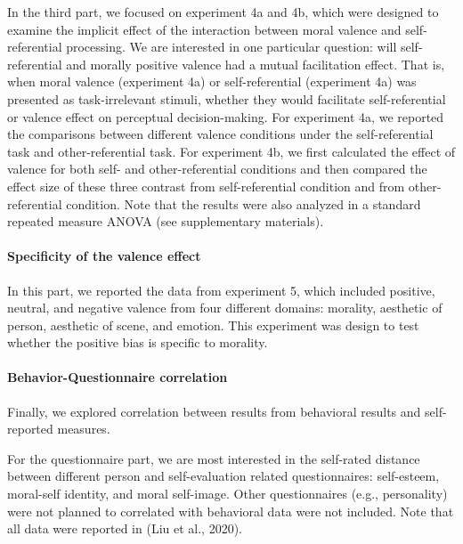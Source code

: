\documentclass[
  english,
  man]{apa6}
\let\oldparagraph\paragraph
\renewcommand{\paragraph}[1]{\oldparagraph{#1}\mbox{}}
\begin{document}
In the third part, we focused on experiment 4a and 4b, which were designed to examine the implicit effect of the interaction between moral valence and self-referential processing. We are interested in one particular question: will self-referential and morally positive valence had a mutual facilitation effect. That is, when moral valence (experiment 4a) or self-referential (experiment 4a) was presented as task-irrelevant stimuli, whether they would facilitate self-referential or valence effect on perceptual decision-making. For experiment 4a, we reported the comparisons between different valence conditions under the self-referential task and other-referential task. For experiment 4b, we first calculated the effect of valence for both self- and other-referential conditions and then compared the effect size of these three contrast from self-referential condition and from other-referential condition. Note that the results were also analyzed in a standard repeated measure ANOVA (see supplementary materials).

\hypertarget{specificity-of-the-valence-effect}{%
\paragraph{Specificity of the valence effect}\label{specificity-of-the-valence-effect}}

In this part, we reported the data from experiment 5, which included positive, neutral, and negative valence from four different domains: morality, aesthetic of person, aesthetic of scene, and emotion. This experiment was design to test whether the positive bias is specific to morality.

\hypertarget{behavior-questionnaire-correlation}{%
\paragraph{Behavior-Questionnaire correlation}\label{behavior-questionnaire-correlation}}

Finally, we explored correlation between results from behavioral results and self-reported measures.

For the questionnaire part, we are most interested in the self-rated distance between different person and self-evaluation related questionnaires: self-esteem, moral-self identity, and moral self-image. Other questionnaires (e.g., personality) were not planned to correlated with behavioral data were not included. Note that all data were reported in (Liu et al., 2020).
\end{document}
